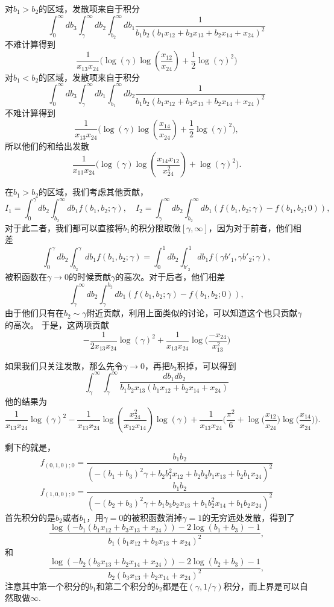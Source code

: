 \documentclass[12pt]{article}
\theoremstyle{definition}
\theoremstyle{plain}
\begin{document}
对$b_1>b_2$的区域，发散项来自于积分
\[
	\int_{0}^\infty db_3\int_{\gamma}^\infty db_2\int_{b_2}^\infty db_1\frac{1}{b_1 b_2 \left(b_1 x_{12}+b_3 x_{13}+b_2 x_{14}+x_{24}\right)^2}
\]
不难计算得到
\[
	\frac{1}{x_{13} x_{24}}\biggl(\log(\gamma) \log \left(\frac{x_{12}}{x_{24}}\right)+\frac 12\log(\gamma)^2\biggr)
\]
对$b_1<b_2$的区域，发散项来自于积分
\[
	\int_{0}^\infty db_3\int_{\gamma}^\infty db_1\int_{b_1}^\infty db_2\frac{1}{b_1 b_2 \left(b_1 x_{12}+b_3 x_{13}+b_2 x_{14}+x_{24}\right)^2}
\]
不难计算得到
\[
	\frac{1}{x_{13} x_{24}}\biggl(\log(\gamma) \log \left(\frac{x_{14}}{x_{24}}\right)+\frac 12\log(\gamma)^2\biggr),
\]
所以他们的和给出发散
\[
	\frac{1}{x_{13} x_{24}}\biggl(\log(\gamma) \log \left(\frac{x_{14}x_{12}}{x_{24}^2}\right)+\log(\gamma)^2\biggr).
\]

在$b_1>b_2$的区域，我们考虑其他贡献，
\[
I_1=\int_{0}^\gamma db_2\int_{b_2}^\infty db_1 f(b_1,b_2;\gamma),\quad 
I_2=\int_{\gamma}^\infty db_2\int_{b_2}^\infty db_1 (f(b_1,b_2;\gamma)-f(b_1,b_2;0)),
\]
对于此二者，我们都可以直接将$b_1$的积分限取做$[\gamma,\infty]$，因为对于前者，他们相差
\[
	\int_{0}^\gamma db_2\int_{b_2}^\gamma db_1 f(b_1,b_2;\gamma)=\int_{0}^1 db_2\int_{b'_2}^1 db_1 f(\gamma b'_1,\gamma b'_2;\gamma),
\]
被积函数在$\gamma\to 0$的时候贡献$\gamma$的高次。对于后者，他们相差
\[
	\int_{\gamma}^\infty db_2\int_{\gamma}^{b_2} db_1(f(b_1,b_2;\gamma)-f(b_1,b_2;0)),
\]
由于他们只有在$b_2\sim \gamma$附近贡献，利用上面类似的讨论，可以知道这个也只贡献$\gamma$的高次。
于是，这两项贡献
\[
	-\frac{1}{2x_{13} x_{24}}\log(\gamma)^2+\frac{1}{x_{13} x_{24}}\log\biggl(\frac{-x_{24}}{x_{13}^2}\biggr)
\]


如果我们只关注发散，那么先令$\gamma\to 0$，再把$b_3$积掉，可以得到
\[
	\int_{\gamma}^\infty\int_{\gamma}^\infty \frac{db_1db_2}{b_1 b_2 x_{13} \left(b_1 x_{12}+b_2 x_{14}+x_{24}\right)}
\]
他的结果为
\[
	\frac{1}{x_{13}x_{24}}\log(\gamma)^2-\frac{1}{x_{13} x_{24}}\log \left(\frac{x_{24}^2}{x_{12} x_{14}}\right)\log(\gamma)+\frac{1}{x_{13}x_{24}}\biggl(\frac{\pi^2}{6}+\log\biggl(\frac{x_{12}}{x_{24}}\biggr)\log\biggl(\frac{x_{14}}{x_{24}}\biggr)\biggr).
\]

剩下的就是，
\[
	f_{(0,1,0);0}=\frac{b_1 b_2}{\left(-\left(b_1+b_3\right)^2 \gamma +b_2 b_1^2 x_{12}+b_2 b_3 b_1 x_{13}+b_2 b_1 x_{24}\right)^2}
\]
\[
	f_{(1,0,0);0}=\frac{b_1 b_2}{\left(-\left(b_2+b_3\right)^2 \gamma +b_1 b_3 b_2 x_{13}+b_1 b_2^2 x_{14}+b_1 b_2 x_{24}\right)^2}
\]
首先积分的是$b_2$或者$b_1$，用$\gamma=0$的被积函数消掉$\gamma=1$的无穷远处发散，得到了
\[
	\frac{\log \left(-b_1 \left(b_1 x_{12}+b_3 x_{13}+x_{24}\right)\right)-2\log \left(b_1+b_3\right)-1}{b_1 \left(b_1 x_{12}+b_3 x_{13}+x_{24}\right)^2},
\]
和
\[
	\frac{\log \left(-b_2 \left(b_3 x_{13}+b_2 x_{14}+x_{24}\right)\right)-2\log \left(b_2+b_3\right)-1}{b_2 \left(b_3 x_{13}+b_2 x_{14}+x_{24}\right)^2},
\]
注意其中第一个积分的$b_1$和第二个积分的$b_2$都是在$(\gamma,1/\gamma)$积分，而上界是可以自然取做$\infty$. 
\end{document}

